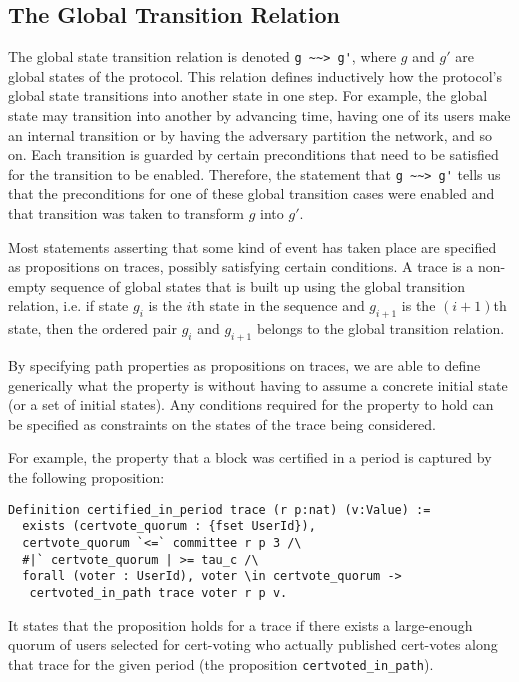 \subsection{The Global Transition Relation}
The global state transition relation is denoted \lstinline{g ~~> g'}, where $g$ and $g'$ are global states of the protocol. This relation defines inductively how the protocol's global state transitions into another state in one step. For example, the global state may transition into another by advancing time, having one of its users make an internal transition or by having the adversary partition the network, and so on. Each transition is guarded by certain preconditions that need to be satisfied for the transition to be enabled. Therefore, the statement that \lstinline{g ~~> g'} tells us that the preconditions for one of these global transition cases were enabled and that transition was taken to transform $g$ into $g'$.

Most statements asserting that some kind of event has taken place are specified as propositions on traces, possibly satisfying certain conditions. A trace is a non-empty sequence of global states that is built up using the global transition relation, i.e. if state $g_i$ is the $i$th state in the sequence and $g_{i+1}$ is the $(i+1)$th state, then the ordered pair $g_i$ and $g_{i+1}$ belongs to the global transition relation. 

By specifying path properties as propositions on traces, we are able to define generically what the property is without having to assume a concrete initial state (or a set of initial states). Any conditions required for the property to hold can be specified as constraints on the states of the trace being considered.

For example, the property that a block was certified in a period is captured by the following proposition:
\begin{lstlisting}[language=Coq]
Definition certified_in_period trace (r p:nat) (v:Value) :=
  exists (certvote_quorum : {fset UserId}),
  certvote_quorum `<=` committee r p 3 /\
  #|` certvote_quorum | >= tau_c /\
  forall (voter : UserId), voter \in certvote_quorum ->
   certvoted_in_path trace voter r p v.
\end{lstlisting}
It states that the proposition holds for a trace if there exists a large-enough quorum of users selected for cert-voting who actually published cert-votes along that trace for the given period (the proposition \lstinline{certvoted_in_path}).

